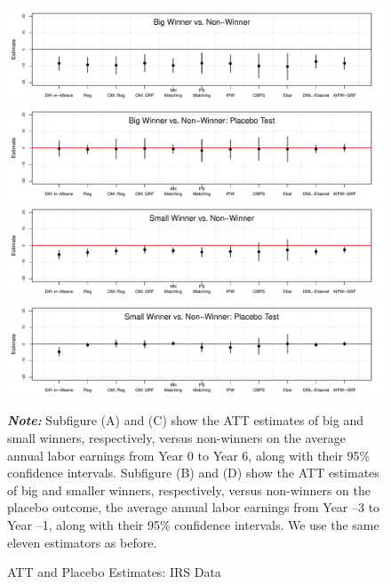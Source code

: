 \documentclass[letterpaper,12pt,leqno]{article}
\begin{document}
\begin{figure}[!ht]
    \caption{ATT and Placebo Estimates: IRS Data}\label{fg:irs.est}
    \vspace{-1em}
    \begin{minipage}[c]{1\textwidth}
    \begin{center}
    \includegraphics[width=0.8\linewidth]{irs_coef_big.pdf}
    \includegraphics[width=0.8\linewidth]{irs_coef_big_pl.pdf}
    \includegraphics[width=0.8\linewidth]{irs_coef_small.pdf}
    \includegraphics[width=0.8\linewidth]{irs_coef_small_pl.pdf}
    \end{center}    
     {\footnotesize\textbf{\textit{Note:}} Subfigure (A) and (C) show the ATT estimates of big and small winners, respectively, versus non-winners on the average annual labor earnings from Year 0 to Year 6, along with their 95\% confidence intervals. Subfigure (B) and (D) show the ATT estimates of big and smaller winners, respectively, versus non-winners on the placebo outcome, the average annual labor earnings from Year –3 to Year –1, along with their 95\% confidence intervals. We use the same eleven estimators as before. }
     \end{minipage}
\end{figure}
\end{document}
